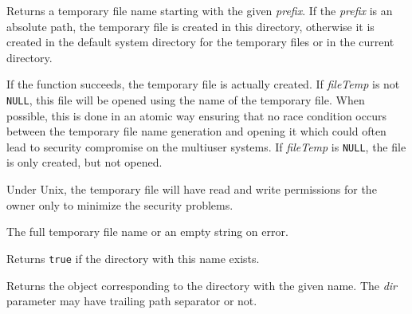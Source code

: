 
Returns a temporary file name starting with the given {\it prefix}. If
the {\it prefix} is an absolute path, the temporary file is created in this
directory, otherwise it is created in the default system directory for the
temporary files or in the current directory.

If the function succeeds, the temporary file is actually created. If\rtfsp
{\it fileTemp} is not {\tt NULL}, this file will be opened using the name of
the temporary file. When possible, this is done in an atomic way ensuring that
no race condition occurs between the temporary file name generation and opening
it which could often lead to security compromise on the multiuser systems.
If {\it fileTemp} is {\tt NULL}, the file is only created, but not opened.

Under Unix, the temporary file will have read and write permissions for the
owner only to minimize the security problems.





The full temporary file name or an empty string on error.


\label{wxfilenamedirexists}



Returns {\tt true} if the directory with this name exists.


\label{wxfilenamedirname}


Returns the object corresponding to the directory with the given name.
The {\it dir} parameter may have trailing path separator or not.



\label{wxfilenamefileexists}


